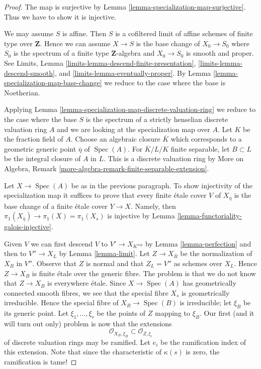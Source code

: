 \documentclass{stacks-project}
\theoremstyle{plain}
\theoremstyle{definition}
\theoremstyle{remark}
\numberwithin{equation}{subsection}
\def\Spec{\mathop{\mathrm{Spec}}}
\begin{document}
\begin{proof}
The map is surjective by
Lemma \ref{lemma-specialization-map-surjective}.
Thus we have to show it is injective.

\medskip\noindent
We may assume $S$ is affine. Then $S$ is a cofiltered limit of affine
schemes of finite type over $\mathbf{Z}$.
Hence we can assume $X \to S$ is the
base change of $X_0 \to S_0$ where $S_0$ is the spectrum of a finite
type $\mathbf{Z}$-algebra and $X_0 \to S_0$ is smooth and proper.
See Limits, Lemma \ref{limits-lemma-descend-finite-presentation},
\ref{limits-lemma-descend-smooth}, and
\ref{limits-lemma-eventually-proper}. By
Lemma \ref{lemma-specialization-map-base-change}
we reduce to the case where the base is Noetherian.

\medskip\noindent
Applying Lemma \ref{lemma-specialization-map-discrete-valuation-ring}
we reduce to the case where the base $S$ is the spectrum of a
strictly henselian discrete valuation ring $A$ and we are
looking at the specialization map over $A$.
Let $K$ be the fraction field of $A$.
Choose an algebraic closure $\overline{K}$ which
corresponds to a geometric generic point $\overline{\eta}$ of $\Spec(A)$.
For $\overline{K}/L/K$ finite separable, let $B \subset L$ be the
integral closure of $A$ in $L$. This is a discrete
valuation ring by
More on Algebra, Remark \ref{more-algebra-remark-finite-separable-extension}.

\medskip\noindent
Let $X \to \Spec(A)$ be as in the previous paragraph.
To show injectivity of the specialization map
it suffices to prove that every finite
\'etale cover $V$ of $X_{\overline{\eta}}$ is the base
change of a finite \'etale cover $Y \to X$.
Namely, then $\pi_1(X_{\overline{\eta}}) \to \pi_1(X) = \pi_1(X_s)$
is injective by Lemma \ref{lemma-functoriality-galois-injective}.

\medskip\noindent
Given $V$ we can first descend $V$ to $V' \to X_{K^{sep}}$ by
Lemma \ref{lemma-perfection} and then to
$V'' \to X_L$ by Lemma \ref{lemma-limit}.
Let $Z \to X_B$ be the normalization of $X_B$ in $V''$.
Observe that $Z$ is normal and that $Z_L = V''$ as schemes
over $X_L$. Hence $Z \to X_B$ is finite \'etale over
the generic fibre. The problem is that we do not know that
$Z \to X_B$ is everywhere \'etale. Since $X \to \Spec(A)$
has geometrically connected smooth fibres, we see that
the special fibre $X_s$ is geometrically irreducible.
Hence the special fibre of $X_B \to \Spec(B)$ is irreducible;
let $\xi_B$ be its generic point. Let
$\xi_1, \ldots, \xi_r$ be the points of $Z$ mapping to
$\xi_B$. Our first (and it will turn out only) problem
is now that the extensions
$$
\mathcal{O}_{X_B, \xi_B} \subset \mathcal{O}_{Z, \xi_i}
$$
of discrete valuation rings may be ramified. Let $e_i$ be
the ramification index of this extension. Note that since the
characteristic of $\kappa(s)$ is zero, the ramification is tame!


\end{proof}
\end{document}
